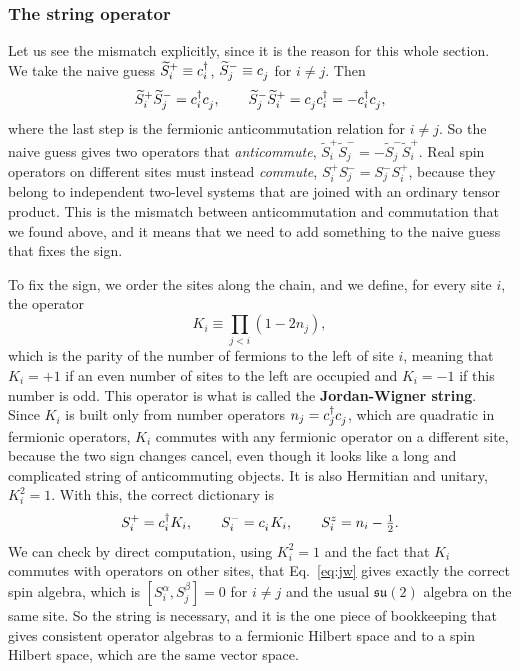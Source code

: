 \documentclass[lecture_notes.tex]{subfiles}
\begin{document}
\subsubsection{The string operator}
Let us see the mismatch explicitly, since it is the reason for this whole section. We take the
naive guess $\widetilde S_i^+ \equiv c^{\dagger}_{i}$, $\widetilde S_j^- \equiv \ann{j}$ for $i\ne j$. Then
\begin{equation}
  \widetilde S_i^+ \widetilde S_j^- = \cre{i}\ann{j}, \qquad
  \widetilde S_j^- \widetilde S_i^+ = \ann{j}\cre{i} = -\cre{i}\ann{j},
\end{equation}
where the last step is the fermionic anticommutation relation for $i\ne j$. So the naive guess
gives two operators that \emph{anticommute}, $\widetilde S_i^+\widetilde S_j^- =
-\widetilde S_j^-\widetilde S_i^+$. Real spin operators on different sites must instead
\emph{commute}, $S_i^+S_j^- = S_j^-S_i^+$, because they belong to independent two-level systems
that are joined with an ordinary tensor product. This is the mismatch between anticommutation and
commutation that we found above, and it means that we need to add something to the naive guess
that fixes the sign.

To fix the sign, we order the sites along the chain, and we define, for every site $i$, the
operator
\begin{equation}
  K_i \equiv \prod_{j<i}\left(1-2n_j\right),
\end{equation}
which is the parity of the number of fermions to the left of site $i$, meaning that $K_i=+1$ if an
even number of sites to the left are occupied and $K_i=-1$ if this number is odd. This operator is
what is called the \textbf{Jordan-Wigner string}. Since $K_i$ is built only from number operators
$n_j=\cre{j}\ann{j}$, which are quadratic in fermionic operators, $K_i$ commutes with any fermionic
operator on a different site, because the two sign changes cancel, even though it looks like a
long and complicated string of anticommuting objects. It is also Hermitian and unitary, $K_i^2=1$.
With this, the correct dictionary is
\begin{equation}
  S_i^+ = \cre{i}K_i, \qquad S_i^- = \ann{i}K_i, \qquad S_i^z = n_i - \tfrac12.
  \label{eq:jw}
\end{equation}
We can check by direct computation, using $K_i^2=1$ and the fact that $K_i$ commutes with
operators on other sites, that Eq.~\eqref{eq:jw} gives exactly the correct spin algebra, which is
$[S_i^\alpha,
S_j^\beta]=0$ for $i\ne j$ and the usual $\mathfrak{su}(2)$ algebra on the same site. So the string
is necessary, and it is the one piece of bookkeeping that gives consistent operator algebras to a
fermionic Hilbert space and to a spin Hilbert space, which are the same vector space.
\end{document}
